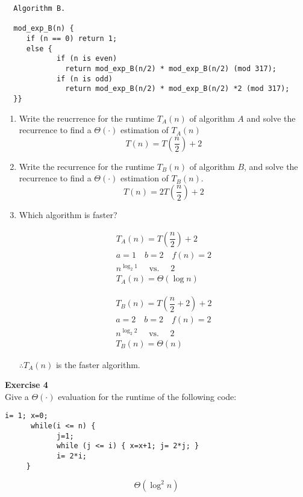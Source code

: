 \message{ !name(solution.tex)}\documentclass[11pt]{article}
\begin{document}
\begin{verbatim}
  Algorithm B.

  mod_exp_B(n) {
     if (n == 0) return 1;
     else {
            if (n is even)
              return mod_exp_B(n/2) * mod_exp_B(n/2) (mod 317);
            if (n is odd)
              return mod_exp_B(n/2) * mod_exp_B(n/2) *2 (mod 317);
  }}
  \end{verbatim}
\begin{enumerate}
	\item Write the reucrrence for the runtime \(T_{A}(n)\) of algorithm $A$ and solve the recurrence to find a \(\Theta(\cdot)\) estimation of \(T_{A}(n)\)
	      \[T(n) = T\left(\dfrac{n}{2}\right) + 2\]
	\item Write the recurrence for the runtime \(T_B(n)\) of algorithm $B$, and solve the recurrence to find a \(\Theta(\cdot)\) estimation of \(T_B(n)\).
	      \[T(n) = 2T\left(\dfrac{n}{2}\right) + 2\]
	\item Which algorithm is faster? \\
	      \begin{minipage}{.5\linewidth}
		      \begin{gather*}
			      T_{A}(n)            =T\left(\dfrac{n}{2}\right) + 2 \\
			      a = 1 \quad         b = 2 \quad f(n) = 2            \\
			      n^{\log_{2}{1}} \quad  \text{ vs. } \quad 2               \\
			      T_{A}(n) = \Theta{(\log{n})}
		      \end{gather*}
	      \end{minipage}
	      \begin{minipage}{.5\linewidth}
		      \begin{gather*}
			      T_{B}(n)  =T\left(\dfrac{n}{2} + 2\right) + 2 \\
            a = 2 \quad          b = 2 \quad f(n) = 2            \\
            n^{\log_{2}{2}} \quad \text{ vs. } \quad 2 \\
             T_{B}(n)=\Theta{(n)}
           \end{gather*}
         \end{minipage}
        \begin{center}
          \(\therefore T_{A}(n)\) is the faster algorithm.
        \end{center}
\end{enumerate}
\newpage
\noindent
\textbf{Exercise 4} \vspace{2mm} \\
Give a \(\Theta(\cdot)\) evaluation for the runtime of the following code:
\begin{center}
	\begin{lstlisting}[numbers=none, keywordstyle=\bfseries, frame=none, title={Assume that $n$ is a power two. Then $i$ from the outer loop takes successively the values: \(1, \quad 2, \quad 2^2, \quad 2^3, \quad \ldots, 2^{\log{n}}\)}]
      i= 1; x=0;
      while(i <= n) {
            j=1;
            while (j <= i) { x=x+1; j= 2*j; }
            i= 2*i;
     }
    \end{lstlisting}
	\[ \Theta{(\log^{2}{n})} \]
\end{center}
\end{document}

